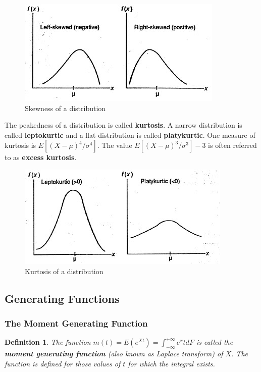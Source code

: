 \documentclass{article}
\newtheorem{definition}{Definition}[section]
\begin{document}
\begin{figure} [H]
    \centering
    \includegraphics{pics/skewness.jpg}
    \caption{Skewness of a distribution}
    \label{skew}
\end{figure}

The peakedness of a distribution is called \textbf{kurtosis}. A narrow distribution is called \textbf{leptokurtic} and a flat distribution is called \textbf{platykurtic}. One measure of kurtosis is \(E[(X-\mu)^4/\sigma^4]\). The value \(E[(X-\mu)^3/\sigma^3]-3\) is often referred to as \textbf{excess kurtosis}.

\begin{figure} [H]
    \centering
    \includegraphics{pics/kurtwosis.jpg}
    \caption{Kurtosis of a distribution}
    \label{kurt}
\end{figure}

\subsection{Generating Functions}

\subsubsection{The Moment Generating Function}

\begin{definition}
    The function \(m(t)=E(e^{Xt})=\int_{- \infty}^{+ \infty} e^xt dF\) is called the \textbf{moment generating function} (also known as Laplace transform) of \(X\). The function is defined for those values of \(t\) for which the integral exists.
\end{definition}
\end{document}
